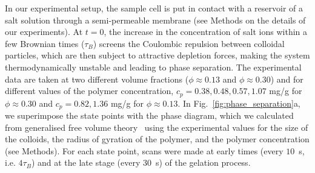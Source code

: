 \documentclass[preprint,amsmath,amssymb,superscriptaddress]{revtex4}
\begin{document}
In our experimental setup, the sample cell is put in contact with a reservoir of a salt solution through a semi-permeable membrane (see Methods 
on the details of our experiments).
At $t=0$, the increase in the concentration of salt ions within a few Brownian times ($\tau_B$) screens the Coulombic repulsion between colloidal particles,
which are then subject to attractive depletion forces, making the system thermodynamically unstable and leading to phase separation. 
The experimental data are taken at two different volume fractions ($\phi\approx 0.13$ and $\phi\approx 0.30$) and for different values
of the polymer concentration, $c_p=0.38,0.48,0.57,1.07$ mg/g for $\phi\approx 0.30$ and $c_p=0.82,1.36$ mg/g for $\phi\approx 0.13$.
In Fig.~\ref{fig:phase_separation}a, we superimpose the state points with the phase diagram, which we calculated from generalised free volume theory~\cite{Fleer2008} using the experimental values for the size of the colloids, the radius of gyration of the polymer, and the polymer concentration (see Methods).
For each state point, scans were made at early times (every $10$~s, i.e. $4\tau_B$) and at the late stage (every $30$~s) of the gelation process. 
\end{document}
